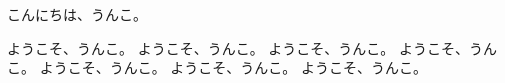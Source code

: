 \documentclass{ltjsarticle}
\begin{document}
    こんにちは、うんこ。

    ようこそ、うんこ。
    ようこそ、うんこ。
    ようこそ、うんこ。
    ようこそ、うんこ。
    ようこそ、うんこ。
    ようこそ、うんこ。
    ようこそ、うんこ。
\end{document}
